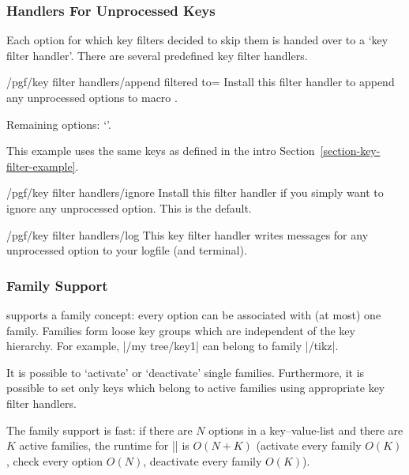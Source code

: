 \subsubsection{Handlers For Unprocessed Keys}

Each option for which key filters decided to skip them is handed over to a `key
filter handler'. There are several predefined key filter handlers.

\begin{key}{/pgf/key filter handlers/append filtered to=}
    Install this filter handler to append any unprocessed options to macro
    .
\begin{codeexample}[]
\def\remainingoptions{}

Remaining options: `\remainingoptions'.
\end{codeexample}
    This example uses the same keys as defined in the intro
    Section~\ref{section-key-filter-example}.
\end{key}

\begin{key}{/pgf/key filter handlers/ignore}
    Install this filter handler if you simply want to ignore any unprocessed
    option. This is the default.
\end{key}

\begin{key}{/pgf/key filter handlers/log}
    This key filter handler writes messages for any unprocessed option to your
    logfile (and terminal).
\end{key}


\subsubsection{Family Support}

\pgfname{} supports a family concept: every option can be associated with (at
most) one family. Families form loose key groups which are independent of the
key hierarchy. For example, |/my tree/key1| can belong to family |/tikz|.

It is possible to `activate' or `deactivate' single families. Furthermore, it
is possible to set only keys which belong to active families using appropriate
key filter handlers.

The family support is fast: if there are $N$ options in a key--value-list and
there are $K$ active families, the runtime for |\pgfkeysfiltered| is $O(N+K)$
(activate every family $O(K)$, check every option $O(N)$, deactivate every
family $O(K)$).

